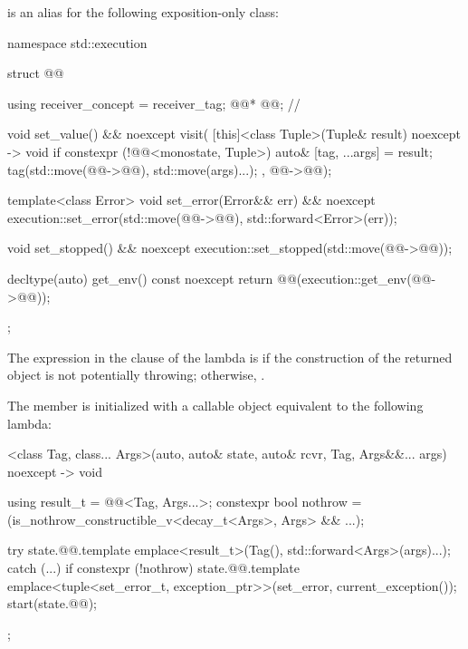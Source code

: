 \pnum
{} is an alias for the following exposition-only class:
\begin{codeblock}
namespace std::execution {
  struct @@ {
    using receiver_concept = receiver_tag;
    @@* @@;          // \expos

    void set_value() && noexcept {
      visit(
        [this]<class Tuple>(Tuple& result) noexcept -> void {
          if constexpr (!@@<monostate, Tuple>) {
            auto& [tag, ...args] = result;
            tag(std::move(@@->@@), std::move(args)...);
          }
        },
        @@->@@);
    }

    template<class Error>
    void set_error(Error&& err) && noexcept {
      execution::set_error(std::move(@@->@@), std::forward<Error>(err));
    }

    void set_stopped() && noexcept {
      execution::set_stopped(std::move(@@->@@));
    }

    decltype(auto) get_env() const noexcept {
      return @@(execution::get_env(@@->@@));
    }
  };
}
\end{codeblock}

\pnum
The expression in the  clause of the lambda is 
if the construction of the returned  object
is not potentially throwing;
otherwise, .

\pnum
The member 
is initialized with a callable object equivalent to the following lambda:
\begin{codeblock}
[]<class Tag, class... Args>(auto, auto& state, auto& rcvr, Tag, Args&&... args) noexcept
    -> void {
  using result_t = @@<Tag, Args...>;
  constexpr bool nothrow = (is_nothrow_constructible_v<decay_t<Args>, Args> && ...);

  try {
    state.@@.template emplace<result_t>(Tag(), std::forward<Args>(args)...);
  } catch (...) {
    if constexpr (!nothrow)
      state.@@.template emplace<tuple<set_error_t,
                                                exception_ptr>>(set_error, current_exception());
  }
  start(state.@@);
};
\end{codeblock}

